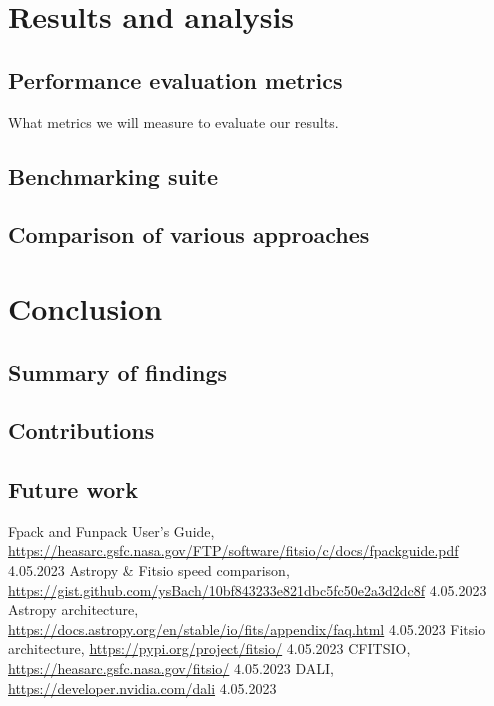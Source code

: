 \documentclass[licencjacka,en]{pracamgr}
\begin{document}
\chapter{Results and analysis}
\section{Performance evaluation metrics}
What metrics we will measure to evaluate our results.
\section{Benchmarking suite}
\section{Comparison of various approaches}

\chapter{Conclusion}
\section{Summary of findings}
\section{Contributions}
\section{Future work}



\begin{thebibliography}{99}

	 {Fpack and Funpack User's Guide},
	\url{https://heasarc.gsfc.nasa.gov/FTP/software/fitsio/c/docs/fpackguide.pdf} 4.05.2023
	 {Astropy \& Fitsio speed comparison},
	\url{https://gist.github.com/ysBach/10bf843233e821dbc5fc50e2a3d2dc8f} 4.05.2023
	 {Astropy architecture},
	\url{https://docs.astropy.org/en/stable/io/fits/appendix/faq.html} 4.05.2023
	 {Fitsio architecture},
	\url{https://pypi.org/project/fitsio/} 4.05.2023
	 CFITSIO,
	\url{https://heasarc.gsfc.nasa.gov/fitsio/} 4.05.2023
	 DALI,
	\url{https://developer.nvidia.com/dali} 4.05.2023



\end{thebibliography}
\end{document}
